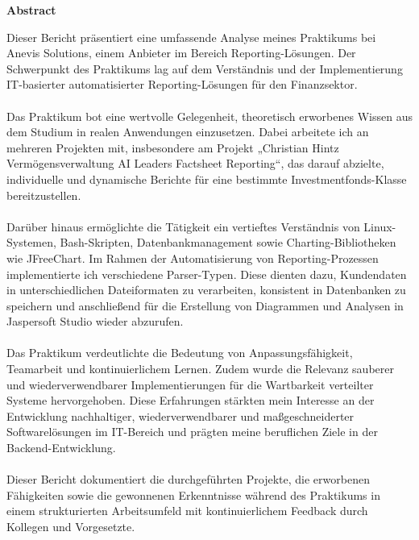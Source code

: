 \thispagestyle{empty}

\vspace*{1cm}

\begin{center}
    \textbf{Abstract}
\end{center}

\vspace*{1cm}

\noindent 
Dieser Bericht präsentiert eine umfassende Analyse meines Praktikums bei Anevis Solutions, einem Anbieter im Bereich Reporting-Lösungen. Der Schwerpunkt des Praktikums lag auf dem Verständnis und der Implementierung IT-basierter automatisierter Reporting-Lösungen für den Finanzsektor.\\\\
Das Praktikum bot eine wertvolle Gelegenheit, theoretisch erworbenes Wissen aus dem Studium in realen Anwendungen einzusetzen. Dabei arbeitete ich an mehreren Projekten mit, insbesondere am Projekt „Christian Hintz Vermögensverwaltung AI Leaders Factsheet Reporting“, das darauf abzielte, individuelle und dynamische Berichte für eine bestimmte Investmentfonds-Klasse bereitzustellen.\\\\
Darüber hinaus ermöglichte die Tätigkeit ein vertieftes Verständnis von Linux-Systemen, Bash-Skripten, Datenbankmanagement sowie Charting-Bibliotheken wie JFreeChart. Im Rahmen der Automatisierung von Reporting-Prozessen implementierte ich verschiedene Parser-Typen. Diese dienten dazu, Kundendaten in unterschiedlichen Dateiformaten zu verarbeiten, konsistent in Datenbanken zu speichern und anschließend für die Erstellung von Diagrammen und Analysen in Jaspersoft Studio wieder abzurufen.\\\\
Das Praktikum verdeutlichte die Bedeutung von Anpassungsfähigkeit, Teamarbeit und kontinuierlichem Lernen. Zudem wurde die Relevanz sauberer und wiederverwendbarer Implementierungen für die Wartbarkeit verteilter Systeme hervorgehoben. Diese Erfahrungen stärkten mein Interesse an der Entwicklung nachhaltiger, wiederverwendbarer und maßgeschneiderter Softwarelösungen im IT-Bereich und prägten meine beruflichen Ziele in der Backend-Entwicklung.\\\\
Dieser Bericht dokumentiert die durchgeführten Projekte, die erworbenen Fähigkeiten sowie die gewonnenen Erkenntnisse während des Praktikums in einem strukturierten Arbeitsumfeld mit kontinuierlichem Feedback durch Kollegen und Vorgesetzte.
